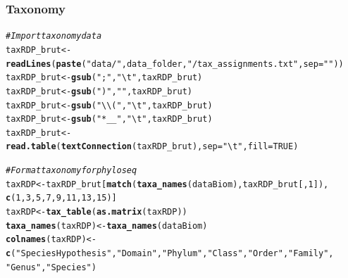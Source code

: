 \documentclass[12pt]{article}\usepackage[]{graphicx}\usepackage[]{color}
\makeatletter
\newcommand{\hlnum}[1]{\textcolor[rgb]{0.686,0.059,0.569}{#1}}%
\newcommand{\hlstr}[1]{\textcolor[rgb]{0.192,0.494,0.8}{#1}}%
\newcommand{\hlcom}[1]{\textcolor[rgb]{0.678,0.584,0.686}{\textit{#1}}}%
\newcommand{\hlstd}[1]{\textcolor[rgb]{0.345,0.345,0.345}{#1}}%
\newcommand{\hlkwb}[1]{\textcolor[rgb]{0.69,0.353,0.396}{#1}}%
\newcommand{\hlkwc}[1]{\textcolor[rgb]{0.333,0.667,0.333}{#1}}%
\newcommand{\hlkwd}[1]{\textcolor[rgb]{0.737,0.353,0.396}{\textbf{#1}}}%
\newenvironment{kframe}{%
 \def\at@end@of@kframe{}%
 \ifinner\ifhmode%
  \def\at@end@of@kframe{\end{minipage}}%
  \begin{minipage}{\columnwidth}%
 \fi\fi%
 \def\FrameCommand##1{\hskip\@totalleftmargin \hskip-\fboxsep
 \colorbox{shadecolor}{##1}\hskip-\fboxsep
     \hskip-\linewidth \hskip-\@totalleftmargin \hskip\columnwidth}%
 \MakeFramed {\advance\hsize-\width
   \@totalleftmargin\z@ \linewidth\hsize
   \@setminipage}}%
 {\par\unskip\endMakeFramed%
 \at@end@of@kframe}
\newenvironment{knitrout}{}{} %
\numberwithin{figure}{section}
\makeatother
\begin{document}
  \subsubsection{Taxonomy}
\begin{knitrout}\small
{}\color{fgcolor}\begin{kframe}
\begin{alltt}
\hlcom{#Import taxonomy data}
\hlstd{taxRDP_brut} \hlkwb{<-} \hlkwd{readLines}\hlstd{(}\hlkwd{paste}\hlstd{(}\hlstr{"data/"}\hlstd{, data_folder,} \hlstr{"/tax_assignments.txt"}\hlstd{,} \hlkwc{sep}\hlstd{=}\hlstr{""}\hlstd{))}
\hlstd{taxRDP_brut} \hlkwb{<-} \hlkwd{gsub}\hlstd{(}\hlstr{";"}\hlstd{,} \hlstr{"\textbackslash{}t"}\hlstd{, taxRDP_brut)}
\hlstd{taxRDP_brut} \hlkwb{<-} \hlkwd{gsub}\hlstd{(}\hlstr{")"}\hlstd{,} \hlstr{""}\hlstd{, taxRDP_brut)}
\hlstd{taxRDP_brut} \hlkwb{<-} \hlkwd{gsub}\hlstd{(}\hlstr{"\textbackslash{}\textbackslash{}("}\hlstd{,} \hlstr{"\textbackslash{}t"}\hlstd{, taxRDP_brut)}
\hlstd{taxRDP_brut} \hlkwb{<-} \hlkwd{gsub}\hlstd{(}\hlstr{"*__"}\hlstd{,} \hlstr{"\textbackslash{}t"}\hlstd{, taxRDP_brut)}
\hlstd{taxRDP_brut} \hlkwb{<-} \hlkwd{read.table}\hlstd{(}\hlkwd{textConnection}\hlstd{(taxRDP_brut),} \hlkwc{sep} \hlstd{=} \hlstr{"\textbackslash{}t"}\hlstd{,} \hlkwc{fill} \hlstd{=} \hlnum{TRUE}\hlstd{)}
\end{alltt}
\end{kframe}
\end{knitrout}

\begin{knitrout}\small
{}\color{fgcolor}\begin{kframe}
\begin{alltt}
\hlcom{# Format taxonomy for phyloseq}
\hlstd{taxRDP} \hlkwb{<-} \hlstd{taxRDP_brut[}\hlkwd{match}\hlstd{(}\hlkwd{taxa_names}\hlstd{(dataBiom), taxRDP_brut[,} \hlnum{1}\hlstd{]),}
                       \hlkwd{c}\hlstd{(}\hlnum{1}\hlstd{,} \hlnum{3}\hlstd{,} \hlnum{5}\hlstd{,} \hlnum{7}\hlstd{,} \hlnum{9}\hlstd{,} \hlnum{11}\hlstd{,} \hlnum{13}\hlstd{,} \hlnum{15}\hlstd{)]}
\hlstd{taxRDP} \hlkwb{<-} \hlkwd{tax_table}\hlstd{(}\hlkwd{as.matrix}\hlstd{(taxRDP))}
\hlkwd{taxa_names}\hlstd{(taxRDP)} \hlkwb{<-} \hlkwd{taxa_names}\hlstd{(dataBiom)}
\hlkwd{colnames}\hlstd{(taxRDP)} \hlkwb{<-} \hlkwd{c}\hlstd{(}\hlstr{"Species Hypothesis"}\hlstd{,} \hlstr{"Domain"}\hlstd{,} \hlstr{"Phylum"}\hlstd{,} \hlstr{"Class"}\hlstd{,} \hlstr{"Order"}\hlstd{,} \hlstr{"Family"}\hlstd{,}
                      \hlstr{"Genus"}\hlstd{,} \hlstr{"Species"}\hlstd{)}
\end{alltt}
\end{kframe}
\end{knitrout}
\end{document}
